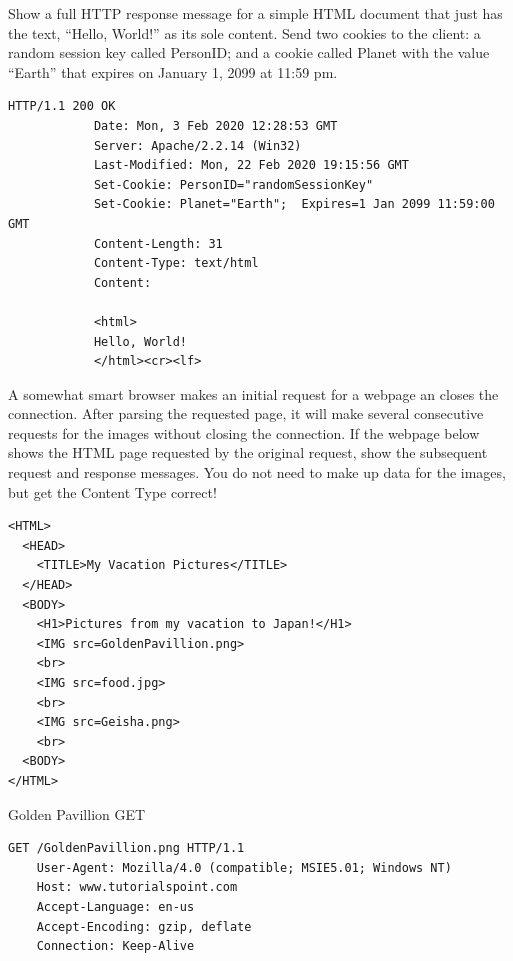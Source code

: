 \documentclass[12pt,addpoints,answers]{exam}
\begin{document}
\begin{questions}
\question[8] Show a full HTTP response message for a simple HTML document that just has the text, ``Hello, World!'' as its sole content. Send two cookies to the client: a random session key called PersonID; and a cookie called Planet with the value ``Earth'' that expires on January 1, 2099 at 11:59 pm.
\begin{solution}
	\begin{minipage}{\textwidth}
		\begin{lstlisting}[language={},escapechar=§,basicstyle=\ttfamily,breaklines=true]
			HTTP/1.1 200 OK
			Date: Mon, 3 Feb 2020 12:28:53 GMT
			Server: Apache/2.2.14 (Win32)
			Last-Modified: Mon, 22 Feb 2020 19:15:56 GMT
			Set-Cookie: PersonID="randomSessionKey"
			Set-Cookie: Planet="Earth";  Expires=1 Jan 2099 11:59:00 GMT
			Content-Length: 31
			Content-Type: text/html
			Content:
			
			<html>
			Hello, World!
			</html><cr><lf>
		\end{lstlisting}
	\end{minipage}
\end{solution}

\question[12] A somewhat smart browser makes an initial request for a webpage an closes the connection. After parsing the requested page, it will make several consecutive requests for the images without closing the connection. If the webpage below shows the HTML page requested by the original request, show the subsequent request and response messages. You do not need to make up data for the images, but get the Content Type correct!\\
\begin{minipage}{\textwidth}
\begin{lstlisting}[language={},escapechar=§,basicstyle=\ttfamily,breaklines=true]
<HTML>
  <HEAD>
    <TITLE>My Vacation Pictures</TITLE>
  </HEAD>
  <BODY>
    <H1>Pictures from my vacation to Japan!</H1>
    <IMG src=GoldenPavillion.png>
    <br>
    <IMG src=food.jpg>
    <br>
    <IMG src=Geisha.png>
    <br>
  <BODY>
</HTML>
\end{lstlisting}
\end{minipage}

\begin{solution}
	
	Golden Pavillion GET
	\begin{minipage}{\textwidth}
	\begin{lstlisting}[language={},escapechar=§,basicstyle=\ttfamily,breaklines=true]
	GET /GoldenPavillion.png HTTP/1.1
	User-Agent: Mozilla/4.0 (compatible; MSIE5.01; Windows NT)
	Host: www.tutorialspoint.com
	Accept-Language: en-us
	Accept-Encoding: gzip, deflate
	Connection: Keep-Alive
	\end{lstlisting}
\end{minipage}


\end{solution}
\end{questions}
\end{document}
